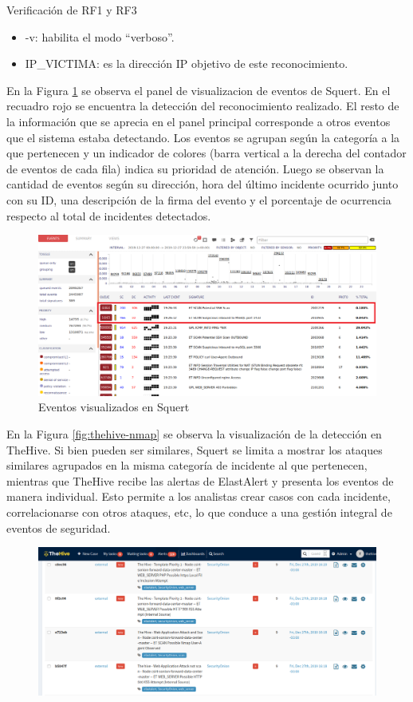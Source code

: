 \begin{section}{Verificación de RF1 y RF3}
\begin{itemize}
        \item -v: habilita el modo “verboso”.
        \item IP\_VICTIMA: es la dirección IP objetivo de este reconocimiento.
    \end{itemize}
    En la Figura \ref{fig:squert-nmap} se observa el panel de visualizacion de eventos de Squert.  En el recuadro rojo se encuentra la detección del reconocimiento realizado. El resto de la información que se aprecia en el panel principal corresponde a otros eventos que el sistema estaba detectando. Los eventos se agrupan según la categoría a la que pertenecen y un indicador de colores (barra vertical a la derecha del contador de eventos de cada fila) indica su prioridad de atención. %
    Luego se observan la cantidad de eventos según su dirección, hora del último incidente ocurrido junto con su ID, una descripción de la firma del evento y el porcentaje de ocurrencia respecto al total de incidentes detectados.
    \begin{figure}[H]
        \centering
        \includegraphics[width=1\textwidth]{./iteracion_1_imagenes/Squert_NMAP.png}
        \caption{Eventos visualizados en Squert}
        \label{fig:squert-nmap}
    \end{figure}
    \FloatBarrier
    En la Figura \ref{fig:thehive-nmap} se observa la visualización de la detección en TheHive. Si bien pueden ser similares, Squert se limita a mostrar los ataques similares agrupados en la misma categoría de incidente al que pertenecen, mientras que TheHive recibe las alertas de ElastAlert y presenta los eventos de manera individual. Esto permite a los analistas crear casos con cada incidente, correlacionarse con otros ataques, etc, lo que conduce a una gestión integral de eventos de seguridad.
    \begin{figure}[H]
        \centering
        \includegraphics[width=1\textwidth]{./iteracion_1_imagenes/TheHive-NMAP.png}

\end{figure}
\end{section}
